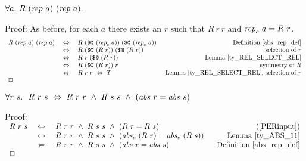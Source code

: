 \documentclass[envcountsame,runningheads]{llncs}
\begin{document}
\begin{theorem}
\label{rep_respects}
$\forall a.\ R\ ({\it rep}\ a)\ ({\it rep}\ a)$.
\end{theorem}
Proof:
As before,
for each $a$
there exists an $r$ such that
$R\ r\ r$ and ${\it rep}_c\ a = R\ r$. 
%
$$
\begin{array}[t]{rcl@{\hspace{0.5cm}}r}
R\ (\mbox{\it rep}\ a)\ (\mbox{\it rep}\ a)
& \ \Leftrightarrow \ &
R\ (\mbox{\tt \$@}\ (\mbox{\it rep}_c\ a))\ (\mbox{\tt \$@}\ (\mbox{\it rep}_c\ a))
& \mbox{Definition \ref{abs_rep_def}}  \\
& \ \Leftrightarrow \ &
R\ (\mbox{\tt \$@}\ (R\ r))\ (\mbox{\tt \$@}\ (R\ r))
& \mbox{selection of $r$}  \\
& \ \Leftrightarrow \ &
R\ r\ (\mbox{\tt \$@}\ (R\ r))
& \mbox{Lemma \ref{ty_REL_SELECT_REL}}  \\
& \ \Leftrightarrow \ &
R\ (\mbox{\tt \$@}\ (R\ r))\ r
& \mbox{symmetry of $R$}  \\
& \ \Leftrightarrow \ &
R\ r\ r \ \Leftrightarrow \ T
& \mbox{Lemma \ref{ty_REL_SELECT_REL}, selection of $r$}  \\
\Box \hfill & & &
\end{array}
$$

\begin{theorem}
\label{equiv_ty_ABS}
$\forall r\ s.\ \ R\ r\ s \ \Leftrightarrow \ 
R\ r\ r\ \wedge \ R\ s\ s\ \wedge \ 
({\it abs}\ r = {\it abs}\ s)$
\end{theorem}
Proof:
$
\begin{array}[t]{rcl@{\hspace{0.6cm}}r}
R\ r\ s
& \ \Leftrightarrow \ &
R\ r\ r \ \wedge\ R\ s\ s \ \wedge\ (R\ r = R\ s)
& \mbox{(\ref{PERinput})}  \\
& \ \Leftrightarrow \ &
R\ r\ r \ \wedge\ R\ s\ s \ \wedge\ 
({\it abs}_c\ (R\ r) = {\it abs}_c\ (R\ s))
& \mbox{Lemma \ref{ty_ABS_11}}  \\
& \ \Leftrightarrow \ &
R\ r\ r \ \wedge\ R\ s\ s \ \wedge\ 
({\it abs}\ r = {\it abs}\ s)
& \mbox{Definition \ref{abs_rep_def}}  \\
\Box \hfill & & &
\end{array}
$
\end{document}

